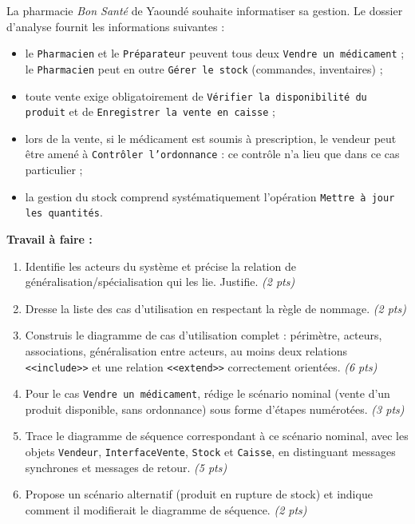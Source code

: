 \documentclass[11pt]{article}
\begin{document}
\begin{exercice}
La pharmacie \emph{Bon Santé} de Yaoundé souhaite informatiser sa gestion. Le dossier d'analyse fournit les informations suivantes :
\begin{itemize}
\item le \texttt{Pharmacien} et le \texttt{Préparateur} peuvent tous deux \texttt{Vendre un médicament} ; le \texttt{Pharmacien} peut en outre \texttt{Gérer le stock} (commandes, inventaires) ;
\item toute vente exige obligatoirement de \texttt{Vérifier la disponibilité du produit} et de \texttt{Enregistrer la vente en caisse} ;
\item lors de la vente, si le médicament est soumis à prescription, le vendeur peut être amené à \texttt{Contrôler l'ordonnance} : ce contrôle n'a lieu que dans ce cas particulier ;
\item la gestion du stock comprend systématiquement l'opération \texttt{Mettre à jour les quantités}.
\end{itemize}
\textbf{Travail à faire :}
\begin{enumerate}
\item Identifie les acteurs du système et précise la relation de généralisation/spécialisation qui les lie. Justifie. \emph{(2 pts)}
\item Dresse la liste des cas d'utilisation en respectant la règle de nommage. \emph{(2 pts)}
\item Construis le diagramme de cas d'utilisation complet : périmètre, acteurs, associations, généralisation entre acteurs, au moins deux relations \texttt{<<include>>} et une relation \texttt{<<extend>>} correctement orientées. \emph{(6 pts)}
\item Pour le cas \texttt{Vendre un médicament}, rédige le scénario nominal (vente d'un produit disponible, sans ordonnance) sous forme d'étapes numérotées. \emph{(3 pts)}
\item Trace le diagramme de séquence correspondant à ce scénario nominal, avec les objets \texttt{Vendeur}, \texttt{InterfaceVente}, \texttt{Stock} et \texttt{Caisse}, en distinguant messages synchrones et messages de retour. \emph{(5 pts)}
\item Propose un scénario alternatif (produit en rupture de stock) et indique comment il modifierait le diagramme de séquence. \emph{(2 pts)}
\end{enumerate}
\end{exercice}
\end{document}
